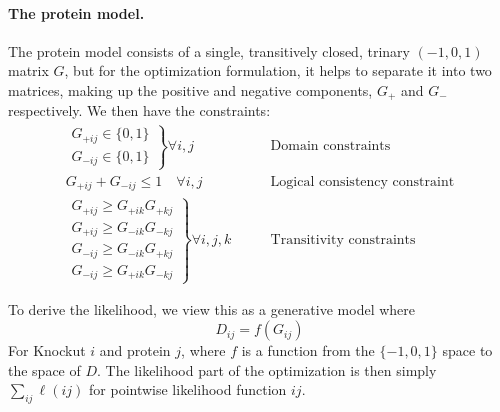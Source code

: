 \documentclass{article}
\begin{document}
\paragraph{The protein model.}
The protein model consists of a single, transitively closed, trinary $(-1, 0, 1)$ matrix $G$, but for the optimization formulation, it helps to separate it into two matrices, making up the positive and negative components, $G_+$ and $G_-$ respectively.
We then have the constraints:
\begin{align}
 \left. \begin{aligned}
  G_{+ij} \in \{0,1\} \\
  G_{-ij} \in \{0,1\}
 \end{aligned} \right\} \forall i,j
 &\qquad \text{Domain constraints} \\
 G_{+ij} + G_{-ij} \leq 1 \quad \forall i,j &\qquad \text{Logical consistency constraint} \\
 \left. \begin{aligned}
  G_{+ij} \geq G_{+ik} G_{+kj} \\
  G_{+ij} \geq G_{-ik} G_{-kj} \\
  G_{-ij} \geq G_{-ik} G_{+kj} \\
  G_{-ij} \geq G_{+ik} G_{-kj}
 \end{aligned} \right\} \forall i,j,k
 &\qquad \text{Transitivity constraints}
\end{align}

To derive the likelihood, we view this as a generative model where
\begin{equation}
 D_{ij} = f( G_{ij} )
\end{equation}
For Knockut $i$ and protein $j$, where $f$ is a function from the $\{ -1, 0, 1\}$ space to the space of $D$.
The likelihood part of the optimization is then simply $\sum_{ij} \ell ( i j )$ for pointwise likelihood function $i j$.
\end{document}
